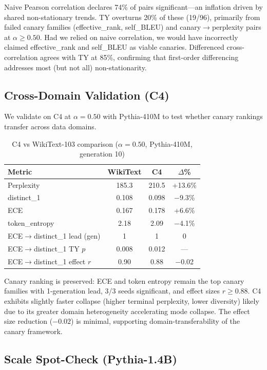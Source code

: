 \documentclass[letterpaper]{article}
\begin{document}
Naive Pearson correlation declares 74\% of pairs significant---an inflation driven by shared non-stationary trends. TY overturns 20\% of these (19/96), primarily from failed canary families (effective\_rank, self\_BLEU) and canary$\to$perplexity pairs at $\alpha \geq 0.50$. Had we relied on naive correlation, we would have incorrectly claimed effective\_rank and self\_BLEU as viable canaries. Differenced cross-correlation agrees with TY at 85\%, confirming that first-order differencing addresses most (but not all) non-stationarity.

\subsection{Cross-Domain Validation (C4)}

We validate on C4 at $\alpha=0.50$ with Pythia-410M to test whether canary rankings transfer across data domains.

\begin{table}[h]
\centering
\caption{C4 vs WikiText-103 comparison ($\alpha=0.50$, Pythia-410M, generation 10)}
\label{tab:c4}
\begin{tabular}{lccc}
\toprule
Metric & WikiText & C4 & $\Delta$\% \\
\midrule
Perplexity & 185.3 & 210.5 & +13.6\% \\
distinct\_1 & 0.108 & 0.098 & $-$9.3\% \\
ECE & 0.167 & 0.178 & +6.6\% \\
token\_entropy & 2.18 & 2.09 & $-$4.1\% \\
ECE$\to$distinct\_1 lead (gen) & 1 & 1 & 0 \\
ECE$\to$distinct\_1 TY $p$ & 0.008 & 0.012 & --- \\
ECE$\to$distinct\_1 effect $r$ & 0.90 & 0.88 & $-$0.02 \\
\bottomrule
\end{tabular}
\end{table}

Canary ranking is preserved: ECE and token entropy remain the top canary families with 1-generation lead, 3/3 seeds significant, and effect sizes $r \geq 0.88$. C4 exhibits slightly faster collapse (higher terminal perplexity, lower diversity) likely due to its greater domain heterogeneity accelerating mode collapse. The effect size reduction ($-0.02$) is minimal, supporting domain-transferability of the canary framework.

\subsection{Scale Spot-Check (Pythia-1.4B)}
\end{document}
